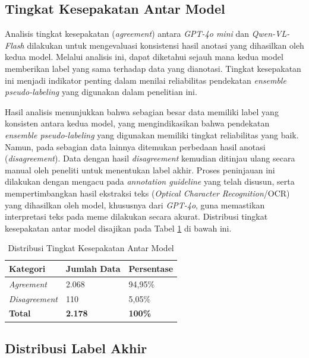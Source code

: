 \subsection{Tingkat Kesepakatan Antar Model} \label{IV.Anotasi.Agreement}
Analisis tingkat kesepakatan (\textit{agreement}) antara \textit{GPT-4o mini} dan \textit{Qwen-VL-Flash} dilakukan untuk mengevaluasi konsistensi hasil anotasi yang dihasilkan oleh kedua model. Melalui analisis ini, dapat diketahui sejauh mana kedua model memberikan label yang sama terhadap data yang dianotasi. Tingkat kesepakatan ini menjadi indikator penting dalam menilai reliabilitas pendekatan \textit{ensemble pseudo-labeling} yang digunakan dalam penelitian ini.

Hasil analisis menunjukkan bahwa sebagian besar data memiliki label yang konsisten antara kedua model, yang mengindikasikan bahwa pendekatan \textit{ensemble pseudo-labeling} yang digunakan memiliki tingkat reliabilitas yang baik. Namun, pada sebagian data lainnya ditemukan perbedaan hasil anotasi (\textit{disagreement}). Data dengan hasil \textit{disagreement} kemudian ditinjau ulang secara manual oleh peneliti untuk menentukan label akhir. Proses peninjauan ini dilakukan dengan mengacu pada \textit{annotation guideline} yang telah disusun, serta mempertimbangkan hasil ekstraksi teks (\textit{Optical Character Recognition}/OCR) yang dihasilkan oleh model, khususnya dari \textit{GPT-4o}, guna memastikan interpretasi teks pada meme dilakukan secara akurat. Distribusi tingkat kesepakatan antar model disajikan pada Tabel \ref{table:4.agreement_distribution} di bawah ini.

\begin{table}[H]
    \centering
    \caption{Distribusi Tingkat Kesepakatan Antar Model}
    \label{table:4.agreement_distribution}
    \small
    \setlength{\tabcolsep}{3pt}
    \renewcommand{\arraystretch}{1.1}
    \begin{tabular}{p{4.5cm} p{3.5cm} p{3.5cm}}
        \hline
        \textbf{Kategori} & \textbf{Jumlah Data} & \textbf{Persentase} \\
        \hline
        \textit{Agreement} & 2.068 & 94,95\% \\
        \textit{Disagreement} & 110 & 5,05\% \\
        \textbf{Total} & \textbf{2.178} & \textbf{100\%} \\
        \hline
    \end{tabular}
\end{table}

\subsection{Distribusi Label Akhir} \label{IV.Anotasi.Distribusi}

